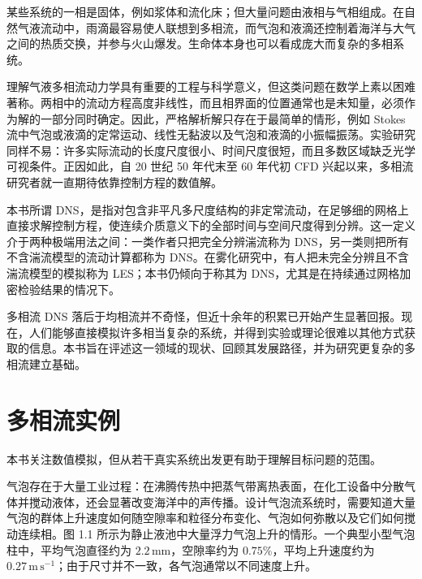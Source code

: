 \documentclass[11pt,a4paper,openany,fontset=none]{ctexbook}
\newenvironment{sourceblock}
  {\par\addvspace{0.65\baselineskip}\noindent\begin{minipage}{\linewidth}\centering}
  {\end{minipage}\par\addvspace{0.48\baselineskip}}
\begin{document}
某些系统的一相是固体，例如浆体和流化床；但大量问题由液相与气相组成。在自然气液流动中，雨滴最容易使人联想到多相流，而气泡和液滴还控制着海洋与大气之间的热质交换，并参与火山爆发。生命体本身也可以看成庞大而复杂的多相系统。

理解气液多相流动力学具有重要的工程与科学意义，但这类问题在数学上素以困难著称。两相中的流动方程高度非线性，而且相界面的位置通常也是未知量，必须作为解的一部分同时确定。因此，严格解析解只存在于最简单的情形，例如 Stokes 流中气泡或液滴的定常运动、线性无黏波以及气泡和液滴的小振幅振荡。实验研究同样不易：许多实际流动的长度尺度很小、时间尺度很短，而且多数区域缺乏光学可视条件。正因如此，自 20 世纪 50 年代末至 60 年代初 CFD 兴起以来，多相流研究者就一直期待依靠控制方程的数值解。

本书所谓 DNS，是指对包含非平凡多尺度结构的非定常流动，在足够细的网格上直接求解控制方程，使连续介质意义下的全部时间与空间尺度得到分辨。这一定义介于两种极端用法之间：一类作者只把完全分辨湍流称为 DNS，另一类则把所有不含湍流模型的流动计算都称为 DNS。在雾化研究中，有人把未完全分辨且不含湍流模型的模拟称为 LES；本书仍倾向于称其为 DNS，尤其是在持续通过网格加密检验结果的情况下。

多相流 DNS 落后于均相流并不奇怪，但近十余年的积累已开始产生显著回报。现在，人们能够直接模拟许多相当复杂的系统，并得到实验或理论很难以其他方式获取的信息。本书旨在评述这一领域的现状、回顾其发展路径，并为研究更复杂的多相流建立基础。

\section{多相流实例}

本书关注数值模拟，但从若干真实系统出发更有助于理解目标问题的范围。

气泡存在于大量工业过程：在沸腾传热中把蒸气带离热表面，在化工设备中分散气体并搅动液体，还会显著改变海洋中的声传播。设计气泡流系统时，需要知道大量气泡的群体上升速度如何随空隙率和粒径分布变化、气泡如何弥散以及它们如何搅动连续相。图 1.1 所示为静止液池中大量浮力气泡上升的情形。一个典型小型气泡柱中，平均气泡直径约为 $2.2\,\mathrm{mm}$，空隙率约为 $0.75\%$，平均上升速度约为 $0.27\,\mathrm{m\,s^{-1}}$；由于尺寸并不一致，各气泡通常以不同速度上升。

\begin{sourceblock}
\end{sourceblock}
\end{document}
